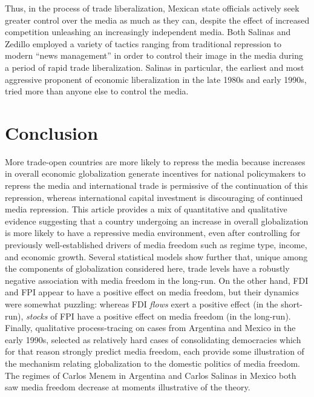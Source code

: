\documentclass[12pt,a4paper]{article}\usepackage[]{graphicx}\usepackage[]{color}
\begin{document}
Thus, in the process of trade liberalization, Mexican state officials actively seek greater control over the media as much as they can, despite the effect of increased competition unleashing an increasingly independent media. Both Salinas and Zedillo employed a variety of tactics ranging from traditional repression to modern “news management” in order to control their image in the media during a period of rapid trade liberalization. Salinas in particular, the earliest and most aggressive proponent of economic liberalization in the late 1980s and early 1990s, tried more than anyone else to control the media.

\section{Conclusion}

More trade-open countries are more likely to repress the media because increases in overall economic globalization generate incentives for national policymakers to repress the media and international trade is permissive of the continuation of this repression, whereas international capital investment is discouraging of continued media repression. This article provides a mix of quantitative and qualitative evidence suggesting that a country undergoing an increase in overall globalization is more likely to have a repressive media environment, even after controlling for previously well-established drivers of media freedom such as regime type, income, and economic growth. Several statistical models show further that, unique among the components of globalization considered here, trade levels have a robustly negative association with media freedom in the long-run. On the other hand, FDI and FPI appear to have a positive effect on media freedom, but their dynamics were somewhat puzzling: whereas FDI \emph{flows} exert a positive effect (in the short-run), \emph{stocks} of FPI have a positive effect on media freedom (in the long-run). Finally, qualitative process-tracing on cases from Argentina and Mexico in the early 1990s, selected as relatively hard cases of consolidating democracies which for that reason strongly predict media freedom, each provide some illustration of the mechanism relating globalization to the domestic politics of media freedom. The regimes of Carlos Menem in Argentina and Carlos Salinas in Mexico both saw media freedom decrease at moments illustrative of the theory.
\end{document}
